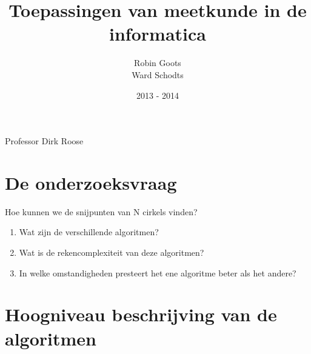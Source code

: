 \documentclass[11pt,a4paper]{article}
\begin{document}
\begin{titlepage}

\title{\Huge Toepassingen van meetkunde in de informatica}

\author{Robin Goots\\
		Ward Schodts\\
		}

\date{2013 - 2014}
\maketitle
\thispagestyle{empty}


\begin{center}
\Large Professor Dirk Roose
\vfill
\end{center}
\end{titlepage}
\section{De onderzoeksvraag}
Hoe kunnen we de snijpunten van N cirkels vinden? 
\begin{enumerate}
\item Wat zijn de verschillende algoritmen?
\item Wat is de rekencomplexiteit van deze algoritmen?
\item In welke omstandigheden presteert het ene algoritme beter als het andere?
\end{enumerate}
\section{Hoogniveau beschrijving van de algoritmen}
\end{document}
